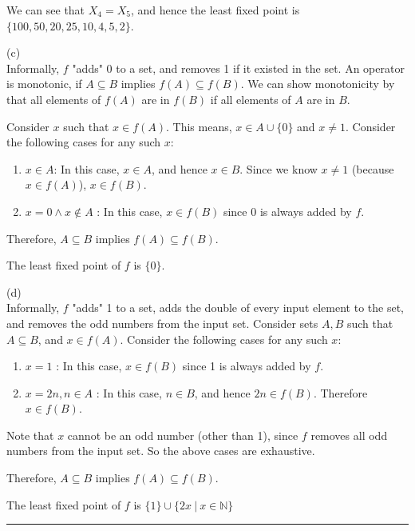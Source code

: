 \documentclass[12pt,letterpaper, onecolumn]{exam}
\begin{document}
\begin{questions}
	We can see that $X_4 = X_5$, and hence the least fixed point is $ \{100, 50, 20, 25, 10, 4, 5, 2\} $.

	(c) \\
	Informally, $f$ "adds" 0 to a set, and removes 1 if it existed in the set.
	An operator is monotonic, if $A \subseteq B$ implies $f(A) \subseteq f(B)$.
	We can show monotonicity by that all elements of $f(A)$ are in $f(B)$ if all elements of $A$ are in $B$.

	Consider $x$ such that $x \in f(A)$. This means, $x \in A \cup \{0\}$ and $x \neq 1$.
	Consider the following cases for any such $x$:
	\begin{enumerate}
		\item $x \in A $: In this case, $x \in A$, and hence $x \in B$. Since we know $x \neq 1$ (because $x \in f(A)$), $x \in f(B)$.
		\item $x = 0 \land x \notin A$ : In this case, $x \in f(B)$ since 0 is always added by $f$.
	\end{enumerate}

	Therefore, $A \subseteq B$ implies $f(A) \subseteq f(B)$.

	The least fixed point of $f$ is $ \{0\} $. 

	(d) \\

	Informally, $f$ "adds" 1 to a set, adds the double of every input element to the set, and removes the odd numbers from the input set.
	Consider sets $A, B$ such that $A \subseteq B$, and $x \in f(A)$.
	Consider the following cases for any such $x$:
	\begin{enumerate}
		\item $x = 1$ : In this case, $x \in f(B)$ since 1 is always added by $f$.
		\item $x = 2n, n \in A$ : In this case, $n \in B$, and hence $2n \in f(B)$. Therefore $x \in f(B)$.
	\end{enumerate}
	Note that $x$ cannot be an odd number (other than 1), since $f$ removes all odd numbers from the input set.
	So the above cases are exhaustive.

	Therefore, $A \subseteq B$ implies $f(A) \subseteq f(B)$.

	The least fixed point of $f$ is $\{1\} \cup \{2x \: | \: x \in \mathbb{N}\}$


    {\rule{17cm}{0.4pt}}

\end{questions}
\end{document}
